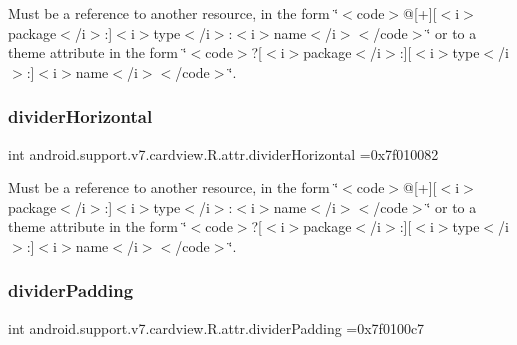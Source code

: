 Must be a reference to another resource, in the form \char`\"{}$<$code$>$@\mbox{[}+\mbox{]}\mbox{[}$<$i$>$package$<$/i$>$\+:\mbox{]}$<$i$>$type$<$/i$>$\+:$<$i$>$name$<$/i$>$$<$/code$>$\char`\"{} or to a theme attribute in the form \char`\"{}$<$code$>$?\mbox{[}$<$i$>$package$<$/i$>$\+:\mbox{]}\mbox{[}$<$i$>$type$<$/i$>$\+:\mbox{]}$<$i$>$name$<$/i$>$$<$/code$>$\char`\"{}. \mbox{\label{classandroid_1_1support_1_1v7_1_1cardview_1_1R_1_1attr_a9914d0b900074616aa5616908df332f2}} 
\subsubsection{\texorpdfstring{divider\+Horizontal}{dividerHorizontal}}
{\footnotesize\ttfamily int android.\+support.\+v7.\+cardview.\+R.\+attr.\+divider\+Horizontal =0x7f010082\hspace{0.3cm}{\ttfamily [static]}}

Must be a reference to another resource, in the form \char`\"{}$<$code$>$@\mbox{[}+\mbox{]}\mbox{[}$<$i$>$package$<$/i$>$\+:\mbox{]}$<$i$>$type$<$/i$>$\+:$<$i$>$name$<$/i$>$$<$/code$>$\char`\"{} or to a theme attribute in the form \char`\"{}$<$code$>$?\mbox{[}$<$i$>$package$<$/i$>$\+:\mbox{]}\mbox{[}$<$i$>$type$<$/i$>$\+:\mbox{]}$<$i$>$name$<$/i$>$$<$/code$>$\char`\"{}. \mbox{\label{classandroid_1_1support_1_1v7_1_1cardview_1_1R_1_1attr_a1f45ca6be4199a2786b81427253f369b}} 
\subsubsection{\texorpdfstring{divider\+Padding}{dividerPadding}}
{\footnotesize\ttfamily int android.\+support.\+v7.\+cardview.\+R.\+attr.\+divider\+Padding =0x7f0100c7\hspace{0.3cm}{\ttfamily [static]}}

